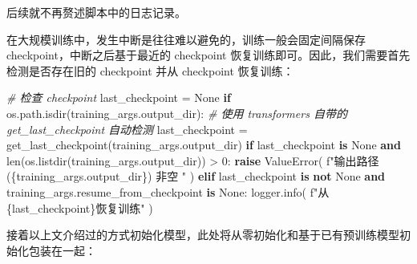 \documentclass[
]{article}
\newenvironment{Shaded}{}{}
\newcommand{\BuiltInTok}[1]{\textcolor[rgb]{0.00,0.50,0.00}{#1}}
\newcommand{\CommentTok}[1]{\textcolor[rgb]{0.38,0.63,0.69}{\textit{#1}}}
\newcommand{\ControlFlowTok}[1]{\textcolor[rgb]{0.00,0.44,0.13}{\textbf{#1}}}
\newcommand{\DecValTok}[1]{\textcolor[rgb]{0.25,0.63,0.44}{#1}}
\newcommand{\KeywordTok}[1]{\textcolor[rgb]{0.00,0.44,0.13}{\textbf{#1}}}
\newcommand{\NormalTok}[1]{#1}
\newcommand{\OperatorTok}[1]{\textcolor[rgb]{0.40,0.40,0.40}{#1}}
\newcommand{\PreprocessorTok}[1]{\textcolor[rgb]{0.74,0.48,0.00}{#1}}
\newcommand{\SpecialCharTok}[1]{\textcolor[rgb]{0.25,0.44,0.63}{#1}}
\newcommand{\SpecialStringTok}[1]{\textcolor[rgb]{0.73,0.40,0.53}{#1}}
\newcommand{\VariableTok}[1]{\textcolor[rgb]{0.10,0.09,0.49}{#1}}
\begin{document}
后续就不再赘述脚本中的日志记录。

在大规模训练中，发生中断是往往难以避免的，训练一般会固定间隔保存
checkpoint，中断之后基于最近的 checkpoint
恢复训练即可。因此，我们需要首先检测是否存在旧的 checkpoint 并从
checkpoint 恢复训练：

\begin{Shaded}
\begin{Highlighting}[]
\CommentTok{\# 检查 checkpoint}
\NormalTok{last\_checkpoint }\OperatorTok{=} \VariableTok{None}
\ControlFlowTok{if}\NormalTok{ os.path.isdir(training\_args.output\_dir):}
    \CommentTok{\# 使用 transformers 自带的 get\_last\_checkpoint 自动检测}
\NormalTok{    last\_checkpoint }\OperatorTok{=}\NormalTok{ get\_last\_checkpoint(training\_args.output\_dir)}
    \ControlFlowTok{if}\NormalTok{ last\_checkpoint }\KeywordTok{is} \VariableTok{None} \KeywordTok{and} \BuiltInTok{len}\NormalTok{(os.listdir(training\_args.output\_dir)) }\OperatorTok{\textgreater{}} \DecValTok{0}\NormalTok{:}
        \ControlFlowTok{raise} \PreprocessorTok{ValueError}\NormalTok{(}
            \SpecialStringTok{f"输出路径 (}\SpecialCharTok{\{}\NormalTok{training\_args}\SpecialCharTok{.}\NormalTok{output\_dir}\SpecialCharTok{\}}\SpecialStringTok{) 非空 "}
\NormalTok{        )}
    \ControlFlowTok{elif}\NormalTok{ last\_checkpoint }\KeywordTok{is} \KeywordTok{not} \VariableTok{None} \KeywordTok{and}\NormalTok{ training\_args.resume\_from\_checkpoint }\KeywordTok{is} \VariableTok{None}\NormalTok{:}
\NormalTok{        logger.info(}
            \SpecialStringTok{f"从 }\SpecialCharTok{\{}\NormalTok{last\_checkpoint}\SpecialCharTok{\}}\SpecialStringTok{恢复训练"}
\NormalTok{        )}
\end{Highlighting}
\end{Shaded}

接着以上文介绍过的方式初始化模型，此处将从零初始化和基于已有预训练模型初始化包装在一起：
\end{document}
